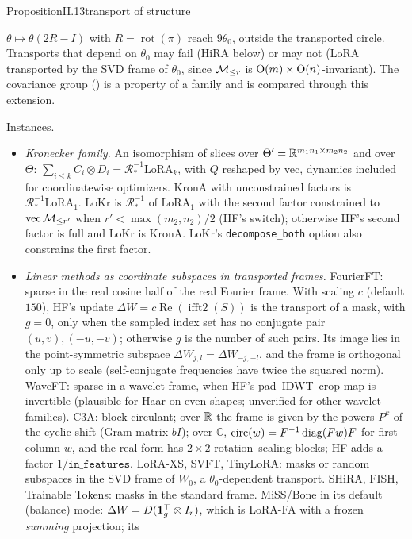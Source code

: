 \begin{restate}{Proposition}{II.13}{transport of structure}
\begin{itemize}
    $\theta\mapsto\theta(2R-I)$ with $R=\operatorname{rot}(\pi)$ reach $9\theta_0$, outside the transported circle.
    Transports that depend on $\theta_0$ may fail (HiRA below) or may not (LoRA transported by the SVD frame of
    $\theta_0$, since $\mathcal{M}_{\le r}$ is $\mathrm{O}(m)\times\mathrm{O}(n)$-invariant). The covariance group () is a
    property of a family and is compared through this extension.
\end{itemize}
Instances.
\begin{itemize}
  \item \emph{Kronecker family.} An isomorphism of slices over $\Theta'=\mathbb{R}^{m_1n_1\times m_2n_2}$ and over $\Theta$:
    $\sum_{i\le k}C_i\otimes D_i=\mathcal R^{-1}_*\mathrm{LoRA}_k$, with $Q$ reshaped by vec, dynamics included for
    coordinatewise optimizers. KronA with unconstrained factors is $\mathcal R^{-1}_*\mathrm{LoRA}_1$. LoKr is
    $\mathcal R^{-1}_*$ of $\mathrm{LoRA}_1$ with the second factor constrained to $\operatorname{vec}\mathcal{M}_{\le r'}$ when
    $r'<\max(m_2,n_2)/2$ (HF's switch); otherwise HF's second factor is full and LoKr is KronA. LoKr's
    \texttt{decompose\_both} option also constrains the first factor.
  \item \emph{Linear methods as coordinate subspaces in transported frames.} FourierFT: sparse in the real cosine half of
    the real Fourier frame. With scaling $c$ (default $150$), HF's update $\Delta W=c\operatorname{Re}(\operatorname{ifft2}(S))$
    is the transport of a mask, with $g=0$, only when the sampled index set has no conjugate pair $(u,v),(-u,-v)$;
    otherwise $g$ is the number of such pairs. Its image lies in the point-symmetric subspace
    $\Delta W_{j,l}=\Delta W_{-j,-l}$, and the frame is orthogonal only up to scale (self-conjugate frequencies have twice
    the squared norm). WaveFT: sparse in a wavelet frame, when HF's pad--IDWT--crop map is invertible (plausible for Haar
    on even shapes; unverified for other wavelet families). C3A: block-circulant; over $\mathbb{R}$ the frame is given by the
    powers $P^k$ of the cyclic shift (Gram matrix $bI$); over $\mathbb C$, $\operatorname{circ}(w)=F^{-1}\operatorname{diag}(Fw)F$ for
    first column $w$, and the real form has $2\times2$ rotation--scaling blocks; HF adds a factor
    $1/\texttt{in\_features}$. LoRA-XS, SVFT, TinyLoRA: masks or random subspaces in the SVD frame of $W_0$, a
    $\theta_0$-dependent transport. SHiRA, FISH, Trainable Tokens: masks in the standard frame. MiSS/Bone in its default
    (balance) mode: $\Delta W=D(\mathbf 1_g^{\top}\otimes I_r)$, which is LoRA-FA with a frozen \emph{summing} projection; its

\end{itemize}
\end{restate}

